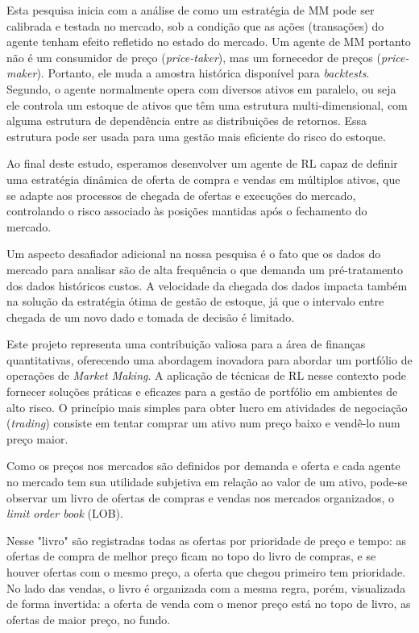 
Esta pesquisa inicia com a análise de como um estratégia de MM pode ser calibrada e testada no mercado, sob a condição que as ações (transações) do agente tenham efeito refletido no estado do mercado. Um agente de MM portanto não é um consumidor de preço (\textit{price-taker}), mas um fornecedor de preços (\textit{price-maker}). Portanto, ele muda a amostra histórica disponível para \textit{backtests}.
Segundo, o agente normalmente opera com diversos ativos em paralelo, ou seja ele controla um estoque de ativos que têm uma estrutura multi-dimensional, com alguma estrutura de dependência entre as distribuições de retornos. Essa estrutura pode ser usada para uma gestão mais eficiente do risco do estoque.

Ao final deste estudo, esperamos desenvolver um agente de RL capaz de definir uma estratégia dinâmica de oferta de compra e vendas em múltiplos ativos, que se adapte aos processos de chegada de ofertas e execuções do mercado, controlando o risco associado às posições mantidas após o fechamento do mercado.

Um aspecto desafiador adicional na nossa pesquisa é o fato que os dados do mercado para analisar são de alta frequência o que demanda um pré-tratamento dos dados históricos custos. A velocidade da chegada dos dados impacta também na solução da estratégia ótima de gestão de estoque, já que o intervalo entre chegada de um novo dado e tomada de decisão é limitado.

Este projeto representa uma contribuição valiosa para a área de finanças quantitativas, oferecendo uma abordagem inovadora para abordar um portfólio de operações de \textit{Market Making}. A aplicação de técnicas de RL nesse contexto pode fornecer soluções práticas e eficazes para a gestão de portfólio em ambientes de alto risco.
O princípio mais simples para obter lucro em atividades de negociação (\textit{trading}) consiste em tentar comprar um ativo num preço baixo e vendê-lo num preço maior.

Como os preços nos mercados são definidos por demanda e oferta e cada agente no mercado tem sua utilidade subjetiva em relação ao valor de um ativo, pode-se observar um livro de ofertas de compras e vendas nos mercados organizados, o \textit{limit order book} (LOB). 

Nesse "livro" são registradas todas as ofertas por prioridade de preço e tempo: as ofertas de compra de melhor preço ficam no topo do livro de compras, e se houver ofertas com o mesmo preço, a oferta que chegou primeiro tem prioridade. No lado das vendas, o livro é organizada com a mesma regra, porém, visualizada de forma invertida: a oferta de venda com o menor preço está no topo de livro, as ofertas de maior preço, no fundo.

